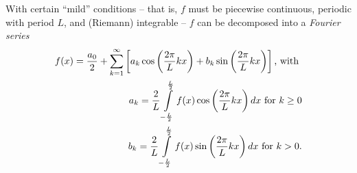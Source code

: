With certain ``mild'' conditions
-- that is, $f$ must be piecewise continuous, periodic with period $L$,  and (Riemann) integrable --
$f$ can be decomposed into a {\em Fourier series}
\begin{equation}
\begin{split}
f(x)={a_0\over2}+\sum_{k=1}^\infty
\left[a_k\cos\left(\frac{2\pi }{L}kx\right)+b_k\sin\left(\frac{2\pi }{L}kx\right)\right] \textrm{, with }\\
   a_k={2\over L}\int\limits_{-\frac{L}{2}}^\frac{L}{2}  f(x)\cos\left(\frac{2\pi }{L}kx\right) dx \textrm{ for } k \ge 0\\
   b_k={2\over L}\int\limits_{-\frac{L}{2}}^\frac{L}{2} f(x)\sin\left(\frac{2\pi }{L}kx\right) dx \textrm{ for } k > 0  .
\end{split}
\label{2012-m-ch-fs}
\end{equation}


